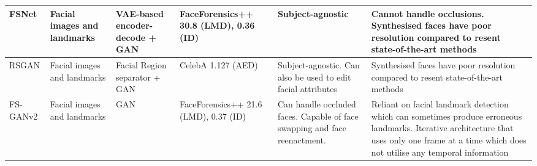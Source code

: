 \begin{table*}[htbp]
{\begin{tabular}{|p{2cm}|p{2cm}|p{2cm}|p{2cm}|p{5cm}|p{5cm}|}
FSNet \cite{natsume2019fsnet}        & Facial images and landmarks                                    & VAE-based encoder-decode +  GAN &    FaceForensics++ \cite{rossler2019faceforensics++} 30.8 (LMD), 0.36 (ID)          & Subject-agnostic                                                                                                    & Cannot handle occlusions. Synthesised faces have poor resolution compared to resent state-of-the-art methods                                                                                    \\ \hline
RSGAN \cite{natsume2018rsgan}         & Facial images and landmarks                                    & Facial Region separator + GAN   &  CelebA \cite{liu2015deep} 1.127 (AED)         & Subject-agnostic. Can also be used to edit facial attributes                                                        & Synthesised faces have poor resolution compared to resent state-of-the-art methods                                                                                                              \\ \hline
FS-GANv2 \cite{nirkin2022fsganv2}     & Facial images and landmarks                                    & GAN                             &    FaceForensics++ \cite{rossler2019faceforensics++} 21.6 (LMD), 0.37 (ID)          & Can handle occluded faces. Capable of face swapping and face reenactment.                                           & Reliant on facial landmark detection which can sometimes produce erroneous landmarks. Iterative architecture that uses only one frame at a time which does not utilise any temporal information \\ \hline


\end{tabular}}
\end{table*}
